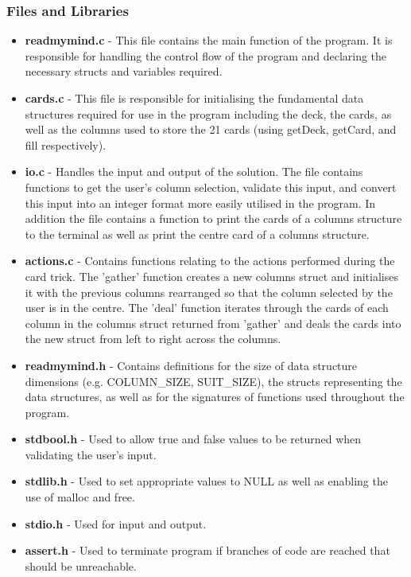 \documentclass[11]{article}
\begin{document}
		\subsubsection{Files and Libraries}
				\begin{itemize}
					\item \textbf{readmymind.c} - This file contains the main function of the program. It is responsible for handling the control flow of the program and declaring the necessary structs and variables required.
					\item \textbf{cards.c} - This file is responsible for initialising the fundamental data structures required for use in the program including the deck, the cards, as well as the columns used to store the 21 cards (using getDeck, getCard, and fill respectively).
					\item \textbf{io.c} - Handles the input and output of the solution. The file contains functions to get the user's column selection, validate this input, and convert this input into an integer format more easily utilised in the program. In addition the file contains a function to print the cards of a columns structure to the terminal as well as print the centre card of a columns structure.
					\item \textbf{actions.c} - Contains functions relating to the actions performed during the card trick. The 'gather' function creates a new columns struct and initialises it with the previous columns rearranged so that the column selected by the user is in the centre. The 'deal' function iterates through the cards of each column in the columns struct returned from 'gather' and deals the cards into the new struct from left to right across the columns.
					\item \textbf{readmymind.h} - Contains definitions for the size of data structure dimensions (e.g. COLUMN\_SIZE, SUIT\_SIZE), the structs representing the data structures, as well as for the signatures of functions used throughout the program.
					\item \textbf{stdbool.h} - Used to allow true and false values to be returned when validating the user's input.
					
					\item \textbf{stdlib.h} - Used to set appropriate values to NULL as well as enabling the use of malloc and free.
					
					\item \textbf{stdio.h} - Used for input and output.
					
					\item \textbf{assert.h} - Used to terminate program if branches of code are reached that should be unreachable.
					

\end{itemize}
\end{document}
